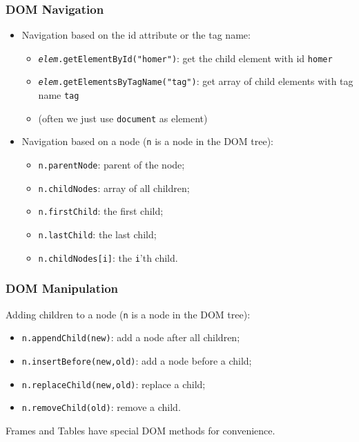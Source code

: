 \documentclass[svgnames,handout]{beamer}
\begin{document}
\begin{frame}\frametitle{DOM Navigation}

  \begin{itemize}
  \item Navigation based on the id attribute or the tag name:
    \begin{itemize}
    \item \texttt{\textit{elem}.getElementById("homer")}: get the child
      element with id \texttt{homer}
    \item \texttt{\textit{elem}.getElementsByTagName("tag")}: get
      array of child elements with tag name \texttt{tag}
    \item (often we just use \texttt{document} as element)
    \end{itemize}

  \item Navigation based on a node (\texttt{n} is a node in the
    DOM tree):
    \begin{itemize}
    \item \texttt{n.parentNode}: parent of the node;
    \item \texttt{n.childNodes}: array of all children;
    \item \texttt{n.firstChild}: the first child;
    \item \texttt{n.lastChild}: the last child;
    \item \texttt{n.childNodes[i]}: the \texttt{i}'th child.
    \end{itemize}
  \end{itemize}
\end{frame}


\begin{frame}\frametitle{DOM Manipulation}

Adding children to a node (\texttt{n} is a node in the DOM tree):
\begin{itemize}
\item \texttt{n.appendChild(new)}: add a node after all children;
\item \texttt{n.insertBefore(new,old)}: add a node before a child;
\item \texttt{n.replaceChild(new,old)}: replace a child;
\item \texttt{n.removeChild(old)}: remove a child.
\end{itemize}

\medskip{}
Frames and Tables have special DOM methods for convenience. 
\end{frame}
\end{document}
